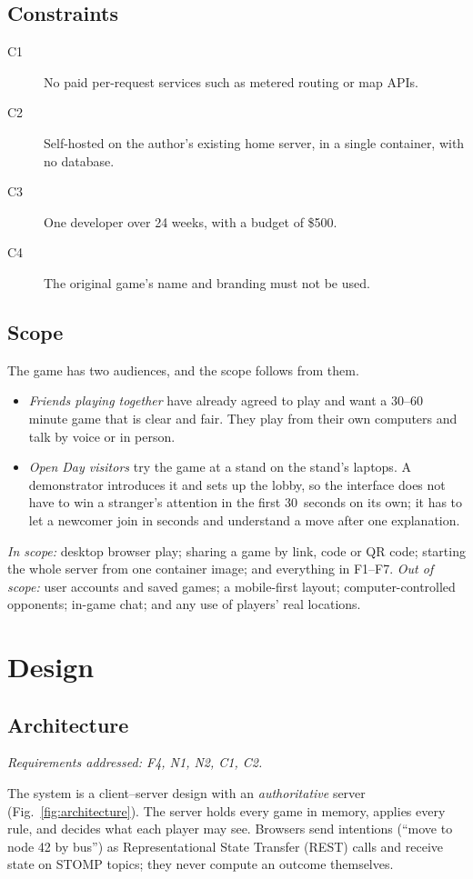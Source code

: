\documentclass[lettersize,journal]{IEEEtran}
\newcommand{\reqs}[1]{\noindent\textit{Requirements addressed: #1.}\par\smallskip}
\begin{document}
\subsection{Constraints}
\begin{description}
	\item[C1] No paid per-request services such as metered routing or map APIs.
	\item[C2] Self-hosted on the author's existing home server, in a single container, with no database.
	\item[C3] One developer over 24 weeks, with a budget of \$500.
	\item[C4] The original game's name and branding must not be used.
\end{description}

\subsection{Scope}
The game has two audiences, and the scope follows from them.
\begin{itemize}
	\item \emph{Friends playing together} have already agreed to play and want a 30--60 minute game that is clear and fair. They play from their own computers and talk by voice or in person.
	\item \emph{Open Day visitors} try the game at a stand on the stand's laptops. A demonstrator introduces it and sets up the lobby, so the interface does not have to win a stranger's attention in the first 30~seconds on its own; it has to let a newcomer join in seconds and understand a move after one explanation.
\end{itemize}
\emph{In scope:} desktop browser play; sharing a game by link, code or QR code; starting the whole server from one container image; and everything in F1--F7.
\emph{Out of scope:} user accounts and saved games; a mobile-first layout; computer-controlled opponents; in-game chat; and any use of players' real locations.

\section{Design}\label{sec:design}

\subsection{Architecture}\label{sec:architecture}
\reqs{F4, N1, N2, C1, C2}
The system is a client--server design with an \emph{authoritative} server (Fig.~\ref{fig:architecture}). The server holds every game in memory, applies every rule, and decides what each player may see. Browsers send intentions (``move to node 42 by bus'') as Representational State Transfer (REST) calls and receive state on STOMP topics; they never compute an outcome themselves.
\end{document}
